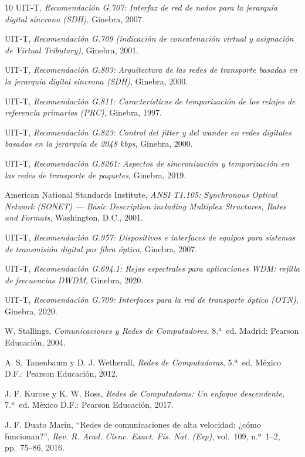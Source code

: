 \documentclass[12pt,a4paper]{article}
\begin{document}
\begin{thebibliography}{10}
    UIT-T, \textit{Recomendación G.707: Interfaz de red de nodos para la jerarquía digital síncrona (SDH)}, Ginebra, 2007.

    UIT-T, \textit{Recomendación G.709 (indicación de concatenación virtual y asignación de \emph{Virtual Tributary})}, Ginebra, 2001.

    UIT-T, \textit{Recomendación G.803: Arquitectura de las redes de transporte basadas en la jerarquía digital síncrona (SDH)}, Ginebra, 2000.

    UIT-T, \textit{Recomendación G.811: Características de temporización de los relojes de referencia primarios (PRC)}, Ginebra, 1997.

    UIT-T, \textit{Recomendación G.823: Control del jitter y del \emph{wander} en redes digitales basadas en la jerarquía de 2048 kbps}, Ginebra, 2000.

    UIT-T, \textit{Recomendación G.8261: Aspectos de sincronización y temporización en las redes de transporte de paquetes}, Ginebra, 2019.

    American National Standards Institute, \textit{ANSI T1.105: Synchronous Optical Network (SONET) --- Basic Description including Multiplex Structures, Rates and Formats}, Washington, D.C., 2001.

    UIT-T, \textit{Recomendación G.957: Dispositivos e interfaces de equipos para sistemas de transmisión digital por fibra óptica}, Ginebra, 2007.

    UIT-T, \textit{Recomendación G.694.1: Rejas espectrales para aplicaciones WDM: rejilla de frecuencias DWDM}, Ginebra, 2020.

    UIT-T, \textit{Recomendación G.709: Interfaces para la red de transporte óptico (OTN)}, Ginebra, 2020.

    W. Stallings, \textit{Comunicaciones y Redes de Computadores}, 8.ª~ed. Madrid: Pearson Educación, 2004.

    A. S. Tanenbaum y D. J. Wetherall, \textit{Redes de Computadoras}, 5.ª~ed. México D.F.: Pearson Educación, 2012.

    J. F. Kurose y K. W. Ross, \textit{Redes de Computadoras: Un enfoque descendente}, 7.ª~ed. México D.F.: Pearson Educación, 2017.

    J. F. Duato Marín, ``Redes de comunicaciones de alta velocidad: ¿cómo funcionan?'', \textit{Rev. R. Acad. Cienc. Exact. Fís. Nat. (Esp)}, vol.~109, n.º~1--2, pp.~75--86, 2016.
\end{thebibliography}
\end{document}
